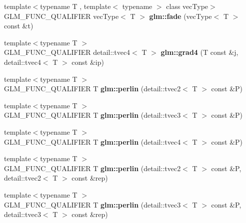 \begin{DoxyCompactItemize}
\item 
\hypertarget{namespaceglm_a556a8de88e3d8300ebfc1d024a9cb85b}{}{\footnotesize template$<$typename T , template$<$ typename $>$ class vec\+Type$>$ }\\G\+L\+M\+\_\+\+F\+U\+N\+C\+\_\+\+Q\+U\+A\+L\+I\+F\+I\+E\+R vec\+Type$<$ T $>$ {\bfseries glm\+::fade} (vec\+Type$<$ T $>$ const \&t)\label{namespaceglm_a556a8de88e3d8300ebfc1d024a9cb85b}

\item 
\hypertarget{namespaceglm_a4eecacbc10511bc5eacd3415edee9e23}{}{\footnotesize template$<$typename T $>$ }\\G\+L\+M\+\_\+\+F\+U\+N\+C\+\_\+\+Q\+U\+A\+L\+I\+F\+I\+E\+R detail\+::tvec4$<$ T $>$ {\bfseries glm\+::grad4} (T const \&j, detail\+::tvec4$<$ T $>$ const \&ip)\label{namespaceglm_a4eecacbc10511bc5eacd3415edee9e23}

\item 
\hypertarget{namespaceglm_a188c12ac107a55a290ba62ef1c44e3b3}{}{\footnotesize template$<$typename T $>$ }\\G\+L\+M\+\_\+\+F\+U\+N\+C\+\_\+\+Q\+U\+A\+L\+I\+F\+I\+E\+R T {\bfseries glm\+::perlin} (detail\+::tvec2$<$ T $>$ const \&P)\label{namespaceglm_a188c12ac107a55a290ba62ef1c44e3b3}

\item 
\hypertarget{namespaceglm_a7543f2468bf634c1dc5e867e8af3473c}{}{\footnotesize template$<$typename T $>$ }\\G\+L\+M\+\_\+\+F\+U\+N\+C\+\_\+\+Q\+U\+A\+L\+I\+F\+I\+E\+R T {\bfseries glm\+::perlin} (detail\+::tvec3$<$ T $>$ const \&P)\label{namespaceglm_a7543f2468bf634c1dc5e867e8af3473c}

\item 
\hypertarget{namespaceglm_a102263cd9bf82863416bce448093cf86}{}{\footnotesize template$<$typename T $>$ }\\G\+L\+M\+\_\+\+F\+U\+N\+C\+\_\+\+Q\+U\+A\+L\+I\+F\+I\+E\+R T {\bfseries glm\+::perlin} (detail\+::tvec4$<$ T $>$ const \&P)\label{namespaceglm_a102263cd9bf82863416bce448093cf86}

\item 
\hypertarget{namespaceglm_a1d307243dc065498ef4f4cdffaee61e2}{}{\footnotesize template$<$typename T $>$ }\\G\+L\+M\+\_\+\+F\+U\+N\+C\+\_\+\+Q\+U\+A\+L\+I\+F\+I\+E\+R T {\bfseries glm\+::perlin} (detail\+::tvec2$<$ T $>$ const \&P, detail\+::tvec2$<$ T $>$ const \&rep)\label{namespaceglm_a1d307243dc065498ef4f4cdffaee61e2}

\item 
\hypertarget{namespaceglm_a0b19062029abc152b036085b5d9621cb}{}{\footnotesize template$<$typename T $>$ }\\G\+L\+M\+\_\+\+F\+U\+N\+C\+\_\+\+Q\+U\+A\+L\+I\+F\+I\+E\+R T {\bfseries glm\+::perlin} (detail\+::tvec3$<$ T $>$ const \&P, detail\+::tvec3$<$ T $>$ const \&rep)\label{namespaceglm_a0b19062029abc152b036085b5d9621cb}


\end{DoxyCompactItemize}
